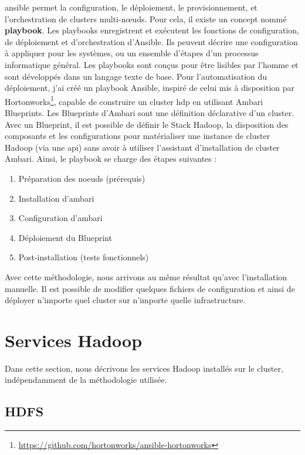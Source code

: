 \documentclass[12pt, french]{report}
\begin{document}
\gls{ansible} permet la configuration, le déploiement, le provisionnement, et l'orchestration de clusters multi-nœuds. Pour cela, il existe un concept nommé \textbf{playbook}. Les playbooks enregistrent et exécutent les fonctions de configuration, de déploiement et d'orchestration d'Ansible. Ils peuvent décrire une configuration à appliquer pour les systèmes, ou un ensemble d'étapes d'un processus informatique général. Les playbooks sont conçus pour être lisibles par l'homme et sont développés dans un langage texte de base. Pour l'automatisation du déploiement, j'ai créé un playbook Ansible, inspiré de celui mis à disposition par Hortonworks\footnote{\href{https://github.com/hortonworks/ansible-hortonworks}{https://github.com/hortonworks/ansible-hortonworks}}, capable de construire un cluster \gls{hdp} en utilisant Ambari Blueprints. Les Blueprints d'Ambari sont une définition déclarative d'un cluster. Avec un Blueprint, il est possible de définir le Stack Hadoop, la disposition des composants et les configurations pour matérialiser une instance de cluster Hadoop (via une \gls{api}) sans avoir à utiliser l'assistant d'installation de cluster Ambari. Ainsi, le playbook se charge des étapes suivantes :

\begin{enumerate}
\item Préparation des noeuds (prérequis)
\item Installation d'\gls{ambari}
\item Configuration d'\gls{ambari}
\item Déploiement du Blueprint
\item Post-installation (tests fonctionnels)
\end{enumerate}

Avec cette méthodologie, nous arrivons au même résultat qu'avec l'installation manuelle. Il est possible de modifier quelques fichiers de configuration et ainsi de déployer n'importe quel cluster sur n'importe quelle infrastructure.

\section{Services Hadoop}

Dans cette section, nous décrivons les services Hadoop installés sur le cluster, indépendamment de la méthodologie utilisée.

\subsection{HDFS}
\end{document}
